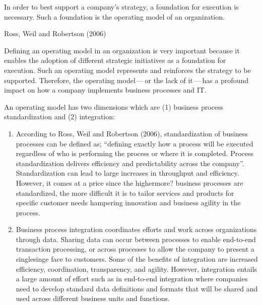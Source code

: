 %
%

In order to best support a company’s strategy, a foundation for execution is necessary.
Such a foundation is the operating model of an organization.

    {Ross, Weil and Robertson (2006)}{}\autocite{ross_weill_robertson_2006}

Defining an operating model in an organization is very important because it enables the
adoption of different strategic initiatives as a foundation for execution.
Such an operating model represents and reinforces the strategy to be supported.
Therefore, the operating model\,---\,or the lack of it\,---\,has a profound impact on how a company
implements business processes and IT.

An operating model has two dimensions which are (1) business process standardization and (2) integration:

\begin{enumerate}
    \item According to Ross, Weil and Robertson (2006), standardization of business processes can be defined as;
          “defining exactly how a process will be executed regardless of who is performing the process or
          where it is completed.
          Process standardization delivers efficiency and predictability across the company”.
          Standardization can lead to large increases in throughput and efficiency.
          However, it comes at a price since the highermore? business processes are standardized,
          the more difficult it is to tailor services and products for specific customer needs hampering
          innovation and business agility in the process.
    \item Business process integration coordinates efforts and work across organizations through data.
          Sharing data can occur between processes to enable end-to-end transaction processing,
          or across processes to allow the company to present a singlesinge face to customers.
          Some of the benefits of integration are increased efficiency, coordination, transparency, and agility.
          However, integration entails a large amount of effort such as in end-to-end integration where companies
          need to develop standard data definitions and formats that will be shared and used across different
          business units and functions.
\end{enumerate}


